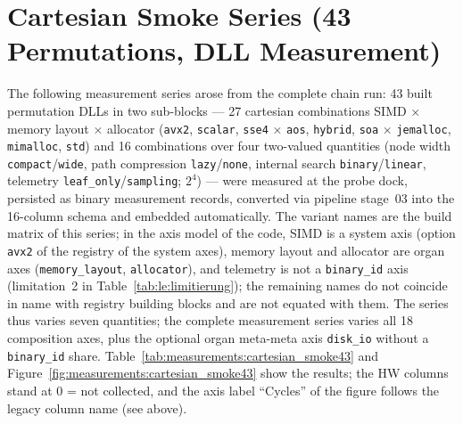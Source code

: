 


\section[head={Cartesian Smoke Series (43 Permutations)}]{Cartesian Smoke Series (43 Permutations, DLL Measurement)}

The following measurement series arose from the complete chain run: 43 built permutation DLLs in
two sub-blocks --- 27 cartesian combinations SIMD $\times$ memory layout $\times$ allocator
(\texttt{avx2}, \texttt{scalar}, \texttt{sse4} $\times$ \texttt{aos}, \texttt{hybrid}, \texttt{soa}
$\times$ \texttt{jemalloc}, \texttt{mimalloc}, \texttt{std}) and 16 combinations over four
two-valued quantities (node width \texttt{compact}/\texttt{wide}, path compression
\texttt{lazy}/\texttt{none}, internal search \texttt{binary}/\texttt{linear}, telemetry
\texttt{leaf\_only}/\texttt{sampling}; $2^4$) --- were measured at the probe dock, persisted as
binary measurement records, converted via pipeline stage~03 into the 16-column schema and embedded
automatically. The variant names are the build matrix of this series; in the axis model of the
code, SIMD is a system axis (option \texttt{avx2} of the registry of the system axes), memory
layout and allocator are organ axes (\texttt{memory\_layout}, \texttt{allocator}), and telemetry is
not a \texttt{binary\_id} axis (limitation~2 in Table~\ref{tab:le:limitierung}); the remaining
names do not coincide in name with registry building blocks and are not equated with them. The
series thus varies seven quantities; the complete measurement series varies all 18 composition
axes, plus the optional organ meta-meta axis \texttt{disk\_io} without a \texttt{binary\_id} share.
Table~\ref{tab:measurements:cartesian_smoke43} and Figure~\ref{fig:measurements:cartesian_smoke43}
show the results; the HW columns stand at 0 = not collected, and the axis label \enquote{Cycles} of
the figure follows the legacy column name (see above).





